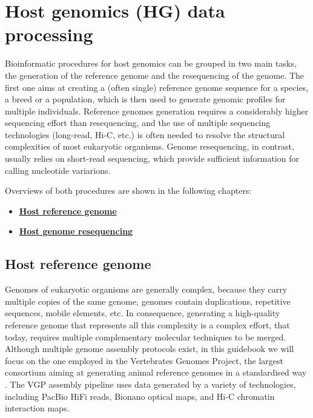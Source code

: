 \documentclass[
]{book}
\providecommand{\tightlist}{%
  \setlength{\itemsep}{0pt}\setlength{\parskip}{0pt}}
\begin{document}
\normalsize

\hypertarget{host-genomics-data-processing}{%
\chapter{Host genomics (HG) data processing}\label{host-genomics-data-processing}}

Bioinformatic procedures for host genomics can be grouped in two main tasks, the generation of the reference genome and the resequencing of the genome. The first one aims at creating a (often single) reference genome sequence for a species, a breed or a population, which is then used to generate genomic profiles for multiple individuals. Reference genomes generation requires a considerably higher sequencing effort than resequencing, and the use of multiple sequencing technologies (long-read, Hi-C, etc.) is often needed to resolve the structural complexities of most eukaryotic organisms. Genome resequencing, in contrast, usually relies on short-read sequencing, which provide sufficient information for calling nucleotide variarions.

Overviews of both procedures are shown in the following chapters:

\begin{itemize}
\tightlist
\item
  \textbf{\protect\hyperlink{host-reference-genome}{Host reference genome}}
\item
  \textbf{\protect\hyperlink{host-resequencing}{Host genome resequencing}}
\end{itemize}

\hypertarget{host-reference-genome}{%
\section{Host reference genome}\label{host-reference-genome}}

Genomes of eukaryotic organisms are generally complex, because they carry multiple copies of the same genome, genomes contain duplications, repetitive sequences, mobile elements, etc. In consequence, generating a high-quality reference genome that represents all this complexity is a complex effort, that today, requires multiple complementary molecular techniques to be merged. Although multiple genome assembly protocols exist, in this guidebook we will focus on the one employed in the Vertebrates Genomes Project, the largest consortium aiming at generating animal reference genomes in a standardised way \citep{Rhie2021-cf}. The VGP assembly pipeline uses data generated by a variety of technologies, including PacBio HiFi reads, Bionano optical maps, and Hi-C chromatin interaction maps.
\end{document}
